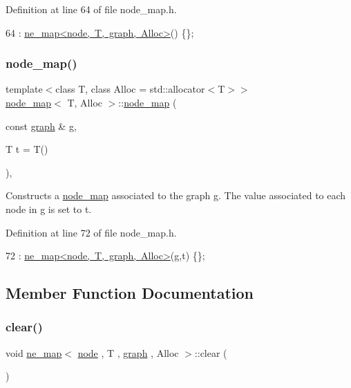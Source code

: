 Definition at line 64 of file node\+\_\+map.\+h.


\begin{DoxyCode}
64 : \mbox{\hyperlink{classne__map}{ne\_map<node, T, graph, Alloc>}}() \{\};
\end{DoxyCode}
\mbox{\label{classnode__map_a5bd24349e3a56379592889abbe4c6b09}} 
\subsubsection{\texorpdfstring{node\+\_\+map()}{node\_map()}\hspace{0.1cm}{\footnotesize\ttfamily [2/2]}}
{\footnotesize\ttfamily template$<$class T, class Alloc = std\+::allocator$<$\+T$>$$>$ \\
\mbox{\hyperlink{classnode__map}{node\+\_\+map}}$<$ T, Alloc $>$\+::\mbox{\hyperlink{classnode__map}{node\+\_\+map}} (\begin{DoxyParamCaption}\item[{const \mbox{\hyperlink{classgraph}{graph}} \&}]{g,  }\item[{T}]{t = {\ttfamily T()} }\end{DoxyParamCaption})\hspace{0.3cm}{\ttfamily [inline]}, {\ttfamily [explicit]}}

Constructs a {\ttfamily \mbox{\hyperlink{classnode__map}{node\+\_\+map}}} associated to the graph {\ttfamily g}. The value associated to each node in {\ttfamily g} is set to {\ttfamily t}. 

Definition at line 72 of file node\+\_\+map.\+h.


\begin{DoxyCode}
72 : \mbox{\hyperlink{classne__map}{ne\_map<node, T, graph, Alloc>}}(\mbox{\hyperlink{rings_8cpp_aa9df5aa3976a89a96a5f1c7611d42938}{g}},t) \{\};
\end{DoxyCode}


\subsection{Member Function Documentation}
\mbox{\label{classne__map_aebe555c23769c6dcc869b5ac7fae6a9c}} 
\subsubsection{\texorpdfstring{clear()}{clear()}}
{\footnotesize\ttfamily void \mbox{\hyperlink{classne__map}{ne\+\_\+map}}$<$ \mbox{\hyperlink{classnode}{node}} , T , \mbox{\hyperlink{classgraph}{graph}} , Alloc $>$\+::clear (\begin{DoxyParamCaption}{ }\end{DoxyParamCaption})\hspace{0.3cm}{\ttfamily [inherited]}}

